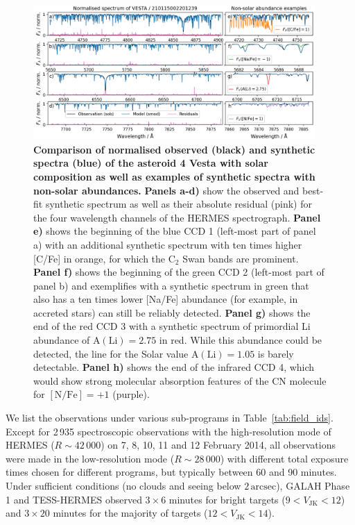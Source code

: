 \documentclass[
  journal=pasa,
  manuscript=research-paper, %
  year=2024,
  volume=37
]{cup-journal}
\begin{document}
\begin{figure}[ht]
 \centering
 \includegraphics[width=0.96\textwidth]{figures/210115002201239_abundance_examples.png}
 \caption{\textbf{Comparison of normalised observed (black) and synthetic spectra (blue) of the asteroid 4 Vesta with solar composition as well as examples of synthetic spectra with non-solar abundances.}
 \textbf{Panels a-d)} show the observed and best-fit synthetic spectrum as well as their absolute residual (pink) for the four wavelength channels of the HERMES spectrograph.
 \textbf{Panel e)} shows the beginning of the blue CCD 1 (left-most part of panel a) with an additional synthetic spectrum with ten times higher [C/Fe] in orange, for which the $\mathrm{C}_2$  Swan bands are prominent.
 \textbf{Panel f)} shows the beginning of the green CCD 2 (left-most part of panel b) and exemplifies with a synthetic spectrum in green that also has a ten times lower [Na/Fe] abundance (for example, in accreted stars) can still be reliably detected. 
 \textbf{Panel g)} shows the end of the red CCD 3 with a synthetic spectrum of primordial Li abundance of $\mathrm{A(Li)} = 2.75$ in red. While this abundance could be detected, the line for the Solar value $\mathrm{A(Li)} = 1.05$ is barely detectable.
 \textbf{Panel h)} shows the end of the infrared CCD 4, which would show strong molecular absorption features of the CN molecule for $\mathrm{[N/Fe]} = +1$ (purple).
 }
 \label{fig:210115002201239_abundance_examples}
\end{figure}

We list the observations under various sub-programs in Table~\ref{tab:field_ids}. Except for 2\,935 spectroscopic observations with the high-resolution mode of HERMES ($R \sim 42\,000$) on 7, 8, 10, 11 and 12 February 2014, all observations were made in the low-resolution mode ($R \sim 28\,000$) with different total exposure times chosen for different programs, but typically between 60 and 90 minutes. Under sufficient conditions (no clouds and seeing below $2\,\mathrm{arcsec}$), GALAH Phase 1 and TESS-HERMES observed $3 \times 6$ minutes for bright targets ($9 < V_\mathrm{JK} < 12$) and $3 \times 20$ minutes for the majority of targets ($12 < V_\mathrm{JK} < 14$).
\end{document}
